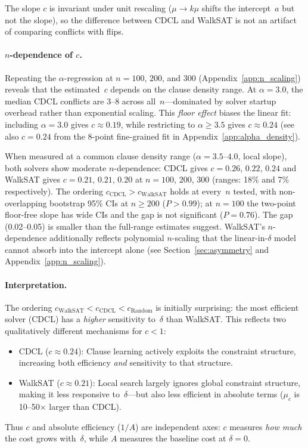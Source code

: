\documentclass[11pt,a4paper]{article}
\newcommand{\mc}{\mu_c}
\begin{document}
The slope $c$ is invariant under unit rescaling
($\mu \to k\mu$ shifts the intercept~$a$ but not the slope),
so the difference between CDCL and WalkSAT is not an artifact of
comparing conflicts with flips.

\paragraph{$n$-dependence of $c$.}
Repeating the $\alpha$-regression at $n = 100$, $200$, and $300$
(Appendix~\ref{app:n_scaling}) reveals that the estimated~$c$
depends on the clause density range.
At $\alpha = 3.0$, the median CDCL conflicts are 3--8 across
all~$n$---dominated by solver startup overhead rather than
exponential scaling.
This \emph{floor effect} biases the linear fit:
including $\alpha = 3.0$ gives $c \approx 0.19$,
while restricting to $\alpha \geq 3.5$ gives $c \approx 0.24$
(see also $c = 0.24$ from the 8-point fine-grained fit
in Appendix~\ref{app:alpha_density}).

When measured at a common clause density range
($\alpha = 3.5$--$4.0$, local slope),
both solvers show moderate $n$-dependence:
CDCL gives $c = 0.26$, $0.22$, $0.24$
and WalkSAT gives $c = 0.21$, $0.21$, $0.20$
at $n = 100$, $200$, $300$ (ranges: 18\% and 7\% respectively).
The ordering $c_{\text{CDCL}} > c_{\text{WalkSAT}}$ holds at
every~$n$ tested, with non-overlapping bootstrap 95\% CIs
at $n \geq 200$ ($P > 0.99$); at $n = 100$ the two-point
floor-free slope has wide CIs and the gap is not significant
($P = 0.76$).
The gap (0.02--0.05) is smaller
than the full-range estimates suggest.
WalkSAT's $n$-dependence additionally reflects polynomial
$n$-scaling that the linear-in-$\delta$ model cannot absorb
into the intercept alone
(see Section~\ref{sec:asymmetry} and Appendix~\ref{app:n_scaling}).

\paragraph{Interpretation.}
The ordering $c_{\text{WalkSAT}} < c_{\text{CDCL}} < c_{\text{Random}}$
is initially surprising: the most efficient solver (CDCL) has a
\emph{higher} sensitivity to~$\delta$ than WalkSAT.
This reflects two qualitatively different mechanisms for $c < 1$:
\begin{itemize}
\item CDCL ($c \approx 0.24$): Clause learning actively exploits the
  constraint structure, increasing both efficiency \emph{and}
  sensitivity to that structure.
\item WalkSAT ($c \approx 0.21$): Local search largely ignores global
  constraint structure, making it less responsive
  to~$\delta$---but also less efficient in absolute terms
  ($\mc$ is 10--50$\times$ larger than CDCL).
\end{itemize}
Thus $c$ and absolute efficiency ($1/A$) are independent axes:
$c$ measures \emph{how much} the cost grows with~$\delta$,
while $A$ measures the baseline cost at $\delta = 0$.
\end{document}
